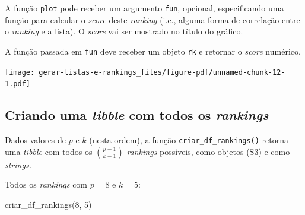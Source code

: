 \documentclass[
  letterpaper,
  DIV=11,
  numbers=noendperiod]{scrreprt}
\newenvironment{Shaded}{\begin{snugshade}}{\end{snugshade}}
\newcommand{\AttributeTok}[1]{\textcolor[rgb]{0.40,0.45,0.13}{#1}}
\newcommand{\DecValTok}[1]{\textcolor[rgb]{0.68,0.00,0.00}{#1}}
\newcommand{\FunctionTok}[1]{\textcolor[rgb]{0.28,0.35,0.67}{#1}}
\newcommand{\NormalTok}[1]{\textcolor[rgb]{0.00,0.23,0.31}{#1}}
\newcommand{\OtherTok}[1]{\textcolor[rgb]{0.00,0.23,0.31}{#1}}
\newcommand{\SpecialCharTok}[1]{\textcolor[rgb]{0.37,0.37,0.37}{#1}}
\begin{document}
A função \texttt{plot} pode receber um argumento \texttt{fun}, opcional,
especificando uma função para calcular o \emph{score} deste
\emph{ranking} (i.e., alguma forma de correlação entre o \emph{ranking}
e a lista). O \emph{score} vai ser mostrado no título do gráfico.

A função passada em \texttt{fun} deve receber um objeto \texttt{rk} e
retornar o \emph{score} numérico.

\begin{Shaded}
\end{Shaded}

\begin{center}
\texttt{[image: gerar-listas-e-rankings\_files/figure-pdf/unnamed-chunk-12-1.pdf]}
\end{center}

\subsection{\texorpdfstring{Criando uma \emph{tibble} com todos os
\emph{rankings}}{Criando uma tibble com todos os rankings}}\label{criando-uma-tibble-com-todos-os-rankings}

Dados valores de $p$ e $k$ (nesta ordem), a função
\texttt{criar\_df\_rankings()} retorna uma \emph{tibble} com todos os
$\binom{p - 1}{k - 1}$ \emph{rankings} possíveis, como objetos (S3) e
como \emph{strings}.

Todos os \emph{rankings} com $p = 8$ e $k = 5$:

\begin{Shaded}
\begin{Highlighting}[]
\FunctionTok{criar\_df\_rankings}\NormalTok{(}\DecValTok{8}\NormalTok{, }\DecValTok{5}\NormalTok{)}
\end{Highlighting}
\end{Shaded}
\end{document}
